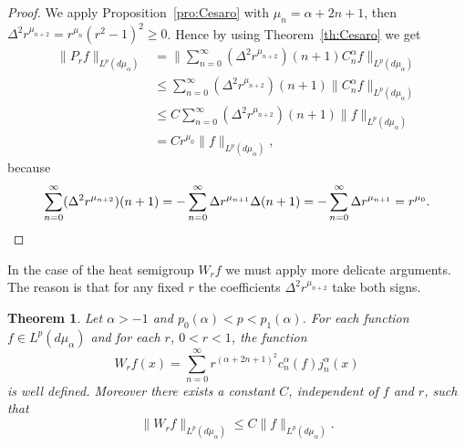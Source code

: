 \documentclass[11pt,a4paper]{amsart}
\newcommand{\mua}{d\mu_\alpha}
\newcommand{\jna}{j_n^{\alpha}}
\newcommand{\cna}{c_n^{\alpha}}
\newcommand{\lpnorm}[3]{\|{#1}\|_{L^{#2}({#3})}} %
\newcommand{\Biglpnorm}[3]{\Big\|{#1}\Big\|_{L^{#2}({#3})}} %
\theoremstyle{plain}
\newtheorem{theor}{Theorem}
\theoremstyle{remark}
\begin{document}
\begin{proof}
We apply Proposition~\ref{pro:Cesaro} with 
$\mu_n = \alpha+2n+1$, then $\Delta^2 r^{\mu_{n+2}} = r^{\mu_n} (r^2 - 1)^2 \ge 0$.
Hence by using Theorem~\ref{th:Cesaro} we get
  \begin{align*}
  \lpnorm{P_r f}{p}{\mua}
  &= \Biglpnorm{\sum_{n=0}^\infty (\Delta^2 r^{\mu_{n+2}}) (n+1) C_n^\alpha f}{p}{\mua} \\
  &\le \sum_{n=0}^\infty (\Delta^2 r^{\mu_{n+2}}) (n+1) \lpnorm{C_n^\alpha f}{p}{\mua} \\
  &\le C \sum_{n=0}^\infty (\Delta^2 r^{\mu_{n+2}}) (n+1) \lpnorm{f}{p}{\mua} \\
  &= C r^{\mu_0} \lpnorm{f}{p}{\mua},
\end{align*}
because
\[
  \sum_{n=0}^\infty (\Delta^2 r^{\mu_{n+2}}) (n+1)
  = -\sum_{n=0}^\infty \Delta r^{\mu_{n+1}} \Delta (n+1)
  = -\sum_{n=0}^\infty \Delta r^{\mu_{n+1}} = r^{\mu_0}.
  \qedhere
\]
\end{proof}

In the case of the heat semigroup $W_r f$ we must apply more delicate arguments. The reason is that for any fixed $r$ the coefficients $\Delta^2 r^{\mu_{n+2}}$ take both signs. 

\begin{theor}
\label{th:heat}
Let $\alpha > -1$ and $p_0(\alpha) < p < p_1(\alpha)$.
For each function $f\in L^p(\mua)$ and for each $r$, $0<r<1$, the function
\[
  W_r f(x) = \sum_{n=0}^\infty r^{(\alpha+2n+1)^2} \cna(f) \jna(x)
\]
is well defined. 
Moreover there exists a constant $C$, independent of $f$ and $r$, such that
\[
  \lpnorm{W_r f}{p}{\mua} \le C \lpnorm{f}{p}{\mua}.
\]
\end{theor}
\end{document}
